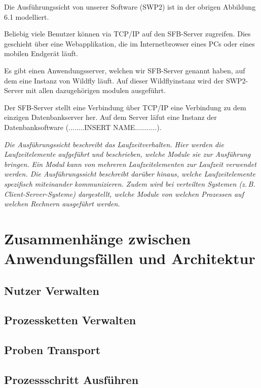 \documentclass[enabledeprecatedfontcommands,fontsize=12pt,paper=a4,twoside]{scrartcl}
\begin{document}
{{ Die Ausführungssicht von unserer Software (SWP2) ist in der obrigen Abbildung 6.1 modelliert.

Beliebig viele Benutzer können via TCP/IP auf den SFB-Server zugreifen. Dies geschieht über eine Webapplikation, die im Internetbrowser eines PCs oder eines mobilen Endgerät läuft.

Es gibt einen Anwendungsserver, welchen wir SFB-Server genannt haben, auf dem eine Instanz von Wildfly läuft. Auf dieser Wildflyinstanz wird der SWP2-Server mit allen dazugehörigen modulen ausgeführt.

Der SFB-Server stellt eine Verbindung über TCP/IP eine Verbindung zu dem einzigen Datenbankserver her. Auf dem Server läfut eine Instanz der Datenbanksoftware (........INSERT NAME...........).

}

{\it
Die Ausführungssicht beschreibt das Laufzeitverhalten. Hier
werden die Laufzeitelemente aufgeführt und beschrieben, welche Module
sie zur Ausführung bringen. Ein Modul kann von mehreren
Laufzeitelementen zur Laufzeit verwendet werden. Die Ausführungssicht
beschreibt darüber hinaus, welche Laufzeitelemente spezifisch
miteinander kommunizieren. Zudem wird bei verteilten Systemen
(z.\,B. Client-Server-Systeme) dargestellt, welche Module von welchen
Prozessen auf welchen Rechnern ausgeführt werden.}


\section[Zusammenhänge zwischen Anwendungsfällen und Architektur]{Zusammenhänge zwischen Anwendungsfällen und Architektur}
\label{sec:anwendungsfaelle}

\subsection{Nutzer Verwalten}
\subsection{Prozessketten Verwalten}
\subsection{Proben Transport}
\subsection{Prozessschritt Ausführen}
}
\end{document}

